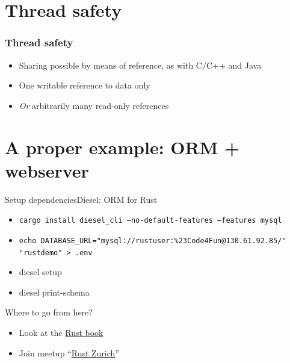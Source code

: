 \documentclass[aspectratio=169]{beamer}
\begin{document}
{
  
}

\section{Thread safety}
\frame{\sectionpage}

\begin{frame}
  \frametitle{Thread safety}

  \begin{itemize}
  \item Sharing possible by means of reference, as with C/C++ and Java
  \item One writable reference to data only
  \item \emph{Or} arbitrarily many read-only references

  \end{itemize}
\end{frame}

\section{A proper example: ORM + webserver}
\frame{\sectionpage}


\begin{frame}[c]{Setup dependencies}{Diesel: ORM for Rust}

  \begin{itemize}
  \item \texttt{cargo install diesel_cli --no-default-features --features mysql}
  \item \texttt{echo DATABASE_URL="mysql://rustuser:\%23Code4Fun@130.61.92.85/"\ }
    \texttt{"rustdemo" > .env}
  \end{itemize}
  \begin{itemize}
  \item diesel setup
  \item diesel print-schema
  \end{itemize}
\end{frame}



\begin{frame}[c]{Where to go from here?}{}

  \begin{itemize}
  \item Look at the \href{https://doc.rust-lang.org/book/ch01-03-hello-cargo.html}{Rust book}
  \item Join meetup ``\href{https://www.meetup.com/Rust-Zurich/}{Rust Zurich}''
  \end{itemize}
\end{frame}
\end{document}
